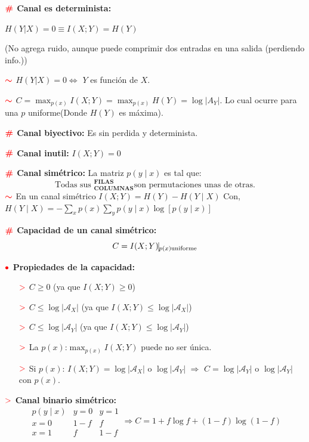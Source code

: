 \documentclass[%
 reprint,
 amsmath,amssymb,
 aps,
]{revtex4-1}
\begin{document}
\textbf{$\color{red}{\textbf{\#}}$ Canal es determinista:} 

$H(Y|X)=0 \equiv I(X;Y)=H(Y)$ 

(No agrega ruido, aunque puede comprimir dos entradas en una salida (perdiendo info.))

\textbf{$\textcolor{red}{\color{red}{\boldsymbol{\sim}}}$} 
$H(Y|X)=0 \Leftrightarrow$ $Y$ es función de $X$.
 
\textbf{$\textcolor{red}{\color{red}{\boldsymbol{\sim}}}$} 
$C =\operatorname{max}_{p(x)} I(X ; Y)= \operatorname{max}_{p(x)}H(Y)=\log|A_Y|$. Lo cual ocurre para una $p$ uniforme(Donde $H(Y)$ es máxima).

\textbf{$\color{red}{\textbf{\#}}$ Canal biyectivo:} 
Es sin perdida y determinista.

\textbf{$\color{red}{\textbf{\#}}$ Canal inutil:} 
$I(X ; Y)=0$

\textbf{$\color{red}{\textbf{\#}}$ Canal simétrico:} 
La matriz $p(y \mid x)$ es tal que:
$$
\text{Todas sus } ^\textbf{FILAS}_\textbf{COLUMNAS} \text{son permutaciones unas de otras.}
$$
$\textcolor{red}{\color{red}{\boldsymbol{\sim}}}$ En un canal simétrico $
  I(X ; Y)=H(Y)-H(Y \mid X)
  $
  Con, $
  H(Y \mid X)=-\sum_{x} p(x) \sum_{y} p(y \mid x) \log [p(y \mid x)]
  $

\textbf{$\color{red}{\textbf{\#}}$ Capacidad de un canal simétrico:} 
$$C=I(X;Y)\vline_{p(x)\text{uniforme}}$$

\textbf{$\color{red}{\bullet}$ Propiedades de la capacidad:}
\begin{enumerate}
  \item[$\textcolor{red}{\mathbf{>}}$] $C \geq 0$ (ya que $I(X ; Y) \geq 0$)
  \item[$\textcolor{red}{\mathbf{>}}$] $C \leq \log \left|\mathcal{A}_{X}\right|$ (ya que $I(X ; Y) \leq \log \left|\mathcal{A}_{X}\right|$)
  \item[$\textcolor{red}{\mathbf{>}}$] $C \leq \log \left|\mathcal{A}_{Y}\right|$ (ya que $I(X ; Y) \leq \log \left|\mathcal{A}_{Y}\right|$)
  \item[$\textcolor{red}{\mathbf{>}}$] La $p(x)$:$\operatorname{max}_{p(x)} I(X ; Y)$  puede no ser única.
  \item[$\textcolor{red}{\mathbf{>}}$] Si $p(x)$: $I(X ; Y)=\log \left|\mathcal{A}_{X}\right|$ o $\log \left|\mathcal{A}_{Y}\right|$ $\Rightarrow$ $C=\log \left|\mathcal{A}_{Y}\right|$ o $\log \left|\mathcal{A}_{Y}\right|$ con $p(x)$.
\end{enumerate}


\textbf{$\textcolor{red}{\mathbf{>}}$ Canal binario simétrico:}
$$
\begin{array}{c|cc}
p(y \mid x) & y=0 & y=1 \\
\hline x=0 & 1-f & f \\
x=1 & f & 1-f
\end{array}
\Rightarrow
C=1+f \log f+(1-f) \log (1-f)
$$
\end{document}
